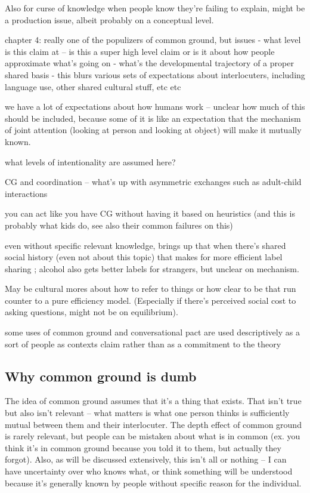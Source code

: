 \documentclass[]{article}
\begin{document}
Also for curse of knowledge when people know they're failing to explain, might be a production issue, albeit probably on a conceptual level. 

\cite{clark1996} chapter 4: really one of the populizers of common ground, but issues
- what level is this claim at -- is this a super high level claim or is it about how people approximate what's going on
- what's the developmental trajectory of a proper shared basis
- this blurs various sets of expectations about interlocuters, including language use, other shared cultural stuff, etc etc

we have a lot of expectations about how humans work -- unclear how much of this should be included, because some of it is like an expectation that the mechanism of joint attention (looking at person and looking at object) will make it mutually known. 

what levels of intentionality are assumed here? 

CG and coordination -- what's up with asymmetric exchanges such as adult-child interactions 

you can act like you have CG without having it based on heuristics (and this is probably what kids do, see also their common failures on this) 

even without specific relevant knowledge, \cite{garrison2022} brings up that when there's shared social history (even not about this topic) that makes for more efficient label sharing ; alcohol also gets better labels for strangers, but unclear on mechanism. 

May be cultural mores about how to refer to things or how clear to be that run counter to a pure efficiency model. (Especially if there's perceived social cost to asking questions, might not be on equilibrium). 

some uses of common ground and conversational pact are used descriptively as a sort of people as contexts claim \cite{leung2023} rather than as a commitment to the theory 

\subsection{Why common ground is dumb}

The idea of common ground assumes that it's a thing that exists. That isn't true but also isn't relevant -- what matters is what one person thinks is sufficiently mutual between them and their interlocuter. The depth effect of common ground is rarely relevant, but people can be mistaken about what is in common (ex. you think it's in common ground because you told it to them, but actually they forgot). Also, as will be discussed extensively, this isn't all or nothing -- I can have uncertainty over who knows what, or think something will be understood because it's generally known by people without specific reason for the individual. 
\end{document}
